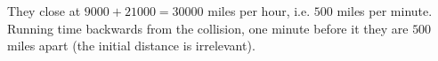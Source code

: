 They close at $9000+21000=30000$ miles per hour, i.e. $500$ miles per minute. Running time backwards from the collision, one minute before it they are $\boxed{500}$ miles apart (the initial distance is irrelevant).
